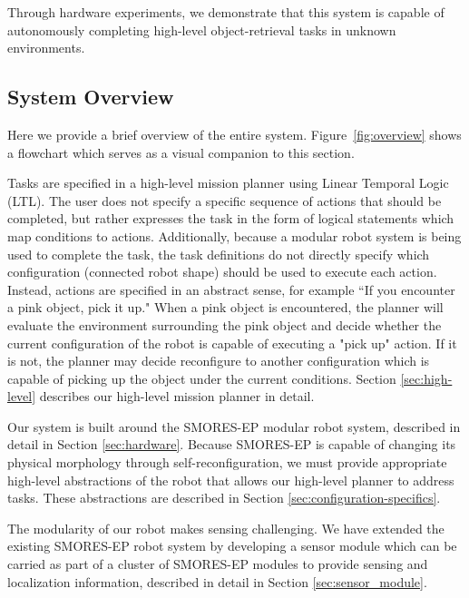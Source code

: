 \documentclass[conference]{IEEEtran}
\begin{document}
Through hardware experiments, we demonstrate that this system is capable of autonomously completing high-level object-retrieval tasks in unknown environments.

%
\subsection{System Overview}
%
Here we provide a brief overview of the entire system.  Figure~\ref{fig:overview} shows a flowchart which serves as a visual companion to this section. 

Tasks are specified in a high-level mission planner using Linear Temporal Logic (LTL). The user does not specify a specific sequence of actions that should be completed, but rather expresses the task in the form of logical statements which map conditions to actions. Additionally, because a modular robot system is being used to complete the task, the task definitions do not directly specify which configuration (connected robot shape) should be used to execute each action. Instead, actions are specified in an abstract sense, for example ``If you encounter a pink object, pick it up." When a pink object is encountered, the planner will evaluate the environment surrounding the pink object and decide whether the current configuration of the robot is capable of executing a "pick up" action.  If it is not, the planner may decide reconfigure to another configuration which is capable of picking up the object under the current conditions.  Section \ref{sec:high-level} describes our high-level mission planner in detail.

Our system is built around the SMORES-EP modular robot system, described in detail in Section \ref{sec:hardware}. Because SMORES-EP is capable of changing its physical morphology through self-reconfiguration, we must provide appropriate high-level abstractions of the robot that allows our high-level planner to address tasks.  These abstractions are described in Section \ref{sec:configuration-specifics}.

The modularity of our robot makes sensing challenging.  We have extended the existing SMORES-EP robot system by developing a sensor module which can be carried as part of a cluster of SMORES-EP modules to provide sensing and localization information, described in detail in Section \ref{sec:sensor_module}.
\end{document}
